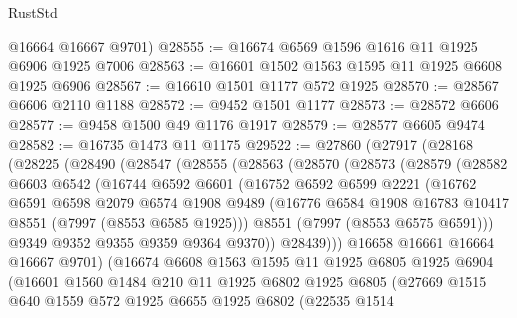 \begin{lexlean}{RustStd}
\begin{coremodule}
      @16664
      @16667
      @9701)
@28555 := @16674 @6569 @1596 @1616 @11 @1925 @6906 @1925 @7006
@28563 := @16601 @1502 @1563 @1595 @11 @1925 @6608 @1925 @6906
@28567 := @16610 @1501 @1177 @572 @1925
@28570 := @28567 @6606 @2110 @1188
@28572 := @9452 @1501 @1177
@28573 := @28572 @6606
@28577 := @9458 @1500 @49 @1176 @1917
@28579 := @28577 @6605 @9474
@28582 := @16735 @1473 @11 @1175
@29522 := @27860
    (@27917
      (@28168
        (@28225
          (@28490
            (@28547
              (@28555
                (@28563
                  (@28570
                    (@28573
                      (@28579
                        (@28582
                          @6603
                          @6542
                          (@16744
                            @6592
                            @6601
                            (@16752
                              @6592
                              @6599
                              @2221
                              (@16762
                                @6591
                                @6598
                                @2079
                                @6574
                                @1908
                                @9489
                                (@16776 @6584 @1908 @16783 @10417 @8551 (@7997 (@8553 @6585 @1925)))
                                @8551
                                (@7997 (@8553 @6575 @6591)))
                              @9349
                              @9352
                              @9355
                              @9359
                              @9364
                              @9370))
                          @28439)))
                    @16658
                    @16661
                    @16664
                    @16667
                    @9701)
                  (@16674
                    @6608
                    @1563
                    @1595
                    @11
                    @1925
                    @6805
                    @1925
                    @6904
                    (@16601
                      @1560
                      @1484
                      @210
                      @11
                      @1925
                      @6802
                      @1925
                      @6805
                      (@27669
                        @1515
                        @640
                        @1559
                        @572
                        @1925
                        @6655
                        @1925
                        @6802
                        (@22535
                          @1514

\end{coremodule}
\end{lexlean}
